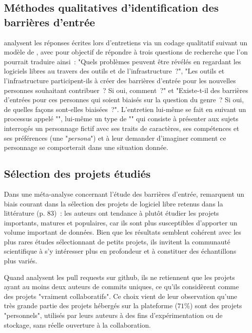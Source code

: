\subsection{Méthodes qualitatives d'identification des barrières d'entrée}

\textcite[p.~1006]{barriers-2018} analysent les réponses écrites lors d'entretiens via un codage qualitatif
suivant un modèle de , avec pour objectif de répondre à trois questions de
recherche que l'on pourrait traduire ainsi : "Quels problèmes peuvent être révélés en regardant les logiciels
libres au travers des outils et de l'infrastructure ?", "Les outils et l'infrastructure participent-ils à
créer des barrières d'entrée pour les nouvelles personnes souhaitant contribuer ? Si oui, comment ?" et
"Existe-t-il des barrières d'entrées pour ces personnes qui soient biaisés sur la question du genre ? Si oui,
de quelles façons sont-elles biaisées ?". L'entretien lui-même se fait en suivant un processus appelé
"", lui-même un type de "" qui consiste à présenter aux sujets
interrogés un personnage fictif avec ses traits de caractères, ses compétences et ses préférences (une
"\emph{persona}") et à leur demander d'imaginer comment ce personnage se comporterait dans une situation
donnée. 

\subsection{Sélection des projets étudiés}

Dans une méta-analyse concernant l'étude des barrières d'entrée,  remarquent
un biais courant dans la sélection des projets de logiciel libre retenus dans la littérature (p. 83) : les
auteurs ont tendance à plutôt étudier les projets importants, matures et populaires, car ils sont plus
susceptibles d'apporter un volume important de données. Bien que les résultats semblent cohérent avec les plus
rares études sélectionnant de petits projets, ils invitent la communauté scientifique à s'y intéresser plus en
profondeur et à constituer des échantillons plus variés.

Quand  analysent les \glspl{pull request} sur \gls{github}, ils ne retiennent
que les projets ayant au moins deux auteurs de \glspl{commit} uniques, ce qu'ils considèrent comme des projets
"vraiment collaboratifs". Ce choix vient de leur observation qu'une très grande partie des projets hébergés
sur la plateforme ($71\%$) sont des projets "personnels", utilisés par leurs auteurs à des fins
d'expérimentation ou de stockage, sans réelle ouverture à la collaboration.
